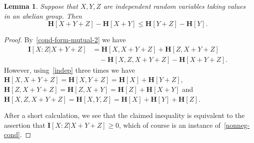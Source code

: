 \documentclass[12pt,reqno,tbtags]{amsart}
\newtheorem{lemma}[theorem]{Lemma}
\theoremstyle{definition}
\theoremstyle{remark}
\renewcommand{\leq}{\leqslant}
\renewcommand{\geq}{\geqslant}
\newcommand{\ent}[1]{\mathbf{H}[#1]}
\newcommand{\I}[1]{\mathbf{I}[#1]}
\numberwithin{equation}{section}
\begin{document}
\begin{lemma}
Suppose that $X, Y, Z$ are independent random variables taking values in an abelian group. Then
\[
  \ent{X + Y + Z} - \ent{X + Y} \leq \ent{Y+Z} - \ent{Y}.
\]
\end{lemma}
\begin{proof}
By~\eqref{cond-form-mutual-2} we have
\begin{align*}
\I{ X : Z | X+Y+Z} &= \ent{X, X+Y+Z} + \ent{Z, X+Y+Z} \\
&\quad - \ent{X, Z, X+Y+Z} - \ent{X+Y+Z}.
\end{align*}
However, using~\eqref{indep} three times we have $\ent{X, X+Y+Z} = \ent{X, Y+Z} = \ent{X} + \ent{Y+Z}$, $\ent{Z, X+Y + Z} = \ent{Z, X+Y} = \ent{Z} + \ent{X+Y}$ and $\ent{X, Z, X+Y+Z} = \ent{X, Y, Z} = \ent{X} + \ent{Y} + \ent{Z}$.

After a short calculation, we see that the claimed inequality is equivalent to the assertion that $\I{ X : Z | X+Y+Z} \geq 0$, which of course is an instance of~\eqref{nonneg-cond}.
\end{proof}
\end{document}
